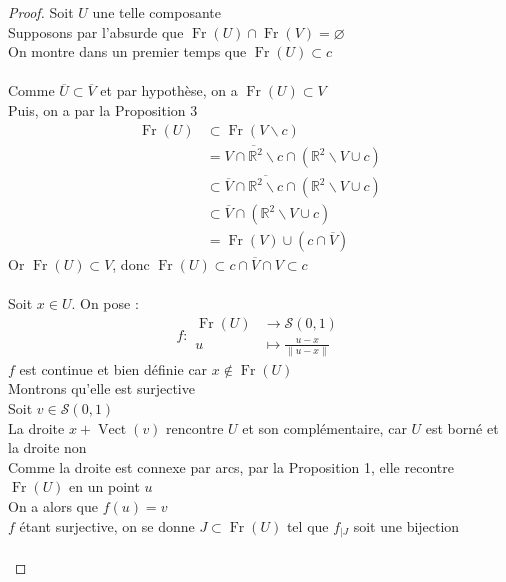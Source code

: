 \documentclass{article}
\begin{document}
\begin{flushleft}
\begin{proof}
    Soit $U$ une telle composante\\
    Supposons par l'absurde que $\operatorname{Fr}(U) \cap \operatorname{Fr}(V) = \varnothing$\\
    On montre dans un premier temps que $\operatorname{Fr}(U) \subset c$
    \\~\\
    Comme $\overline{U} \subset \overline{V}$ et par hypothèse, on a $\operatorname{Fr}(U) \subset V$\\
    Puis, on a par la Proposition 3
    \begin{align*}
        \operatorname{Fr}(U) &\subset \operatorname{Fr}(V \backslash c)\\
        &= \overline{V \cap \mathbb{R}^2 \backslash c} \cap (\mathbb{R}^2 \backslash V \cup c)\\
        &\subset \overline{V} \cap \overline{\mathbb{R}^2 \backslash c} \cap (\mathbb{R}^2 \backslash V \cup c)\\
        &\subset \overline{V} \cap (\mathbb{R}^2 \backslash V \cup c)\\
        &= \operatorname{Fr}(V) \cup (c \cap \overline{V})
    \end{align*}
    Or $\operatorname{Fr}(U) \subset V$, donc $\operatorname{Fr}(U) \subset c \cap \overline{V} \cap V \subset c$
    \\~\\
    Soit $x \in U$. On pose :
    \[ f : \begin{array}{cl}
        \operatorname{Fr}(U) &\longrightarrow \mathcal{S}(0, 1)\\
        u &\longmapsto \frac{u-x}{\|u-x\|}
    \end{array}\]
    $f$ est continue et bien définie car $x \notin \operatorname{Fr}(U)$\\
    Montrons qu'elle est surjective\\
    Soit $v \in \mathcal{S}(0, 1)$\\
    La droite $x + \operatorname{Vect}(v)$ rencontre $U$ et son complémentaire, car $U$ est borné et la droite non\\
    Comme la droite est connexe par arcs, par la Proposition 1, elle recontre $\operatorname{Fr}(U)$ en un point $u$\\
    On a alors que $f(u) = v$\\
    $f$ étant surjective, on se donne $J \subset \operatorname{Fr}(U)$ tel que $f_{\mid J}$ soit une bijection
    \\~\\

\end{proof}
\end{flushleft}
\end{document}
